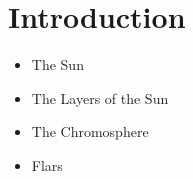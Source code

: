 \chapter{Introduction}

\begin{itemize}
    \item The Sun
    \item The Layers of the Sun
    \item The Chromosphere
    \item Flars
\end{itemize}